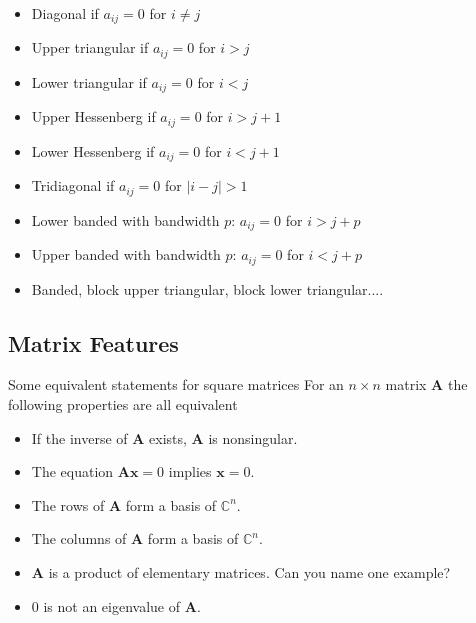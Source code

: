\begin{itemize}
  \item Diagonal if $a_{ij}=0$ for $i\ne j$

  \item Upper triangular if $a_{ij}=0$ for $i > j$

  \item Lower triangular if $a_{ij}=0$ for $i < j$

  \item Upper Hessenberg if $a_{ij}=0$ for $i > j+1$

  \item Lower Hessenberg if $a_{ij}=0$ for $i < j+1$

  \item Tridiagonal if $a_{ij}=0$ for $|i -j| > 1$

  \item Lower banded with bandwidth $p$: $a_{ij}=0$ for $i > j+p$

  \item Upper banded with bandwidth $p$: $a_{ij}=0$ for $i < j+p$

  \item Banded, block upper triangular, block lower triangular....
\end{itemize}

\noindent
\subsection{Matrix Features}

\begin{block}{Some equivalent statements for square matrices }
For an $n\times n$ matrix  $\bm{A}$ the following properties are all equivalent

\begin{itemize}
  \item If the inverse of $\bm{A}$ exists, $\bm{A}$ is nonsingular.

  \item The equation $\bm{Ax}=0$ implies $\bm{x}=0$.

  \item The rows of $\bm{A}$ form a basis of $\mathbb{C}^{n}$.

  \item The columns of $\bm{A}$ form a basis of $\mathbb{C}^{n}$.

  \item $\bm{A}$ is a product of elementary matrices. Can you name one example?

  \item $0$ is not an eigenvalue of $\bm{A}$.
\end{itemize}

\noindent
\end{block}


